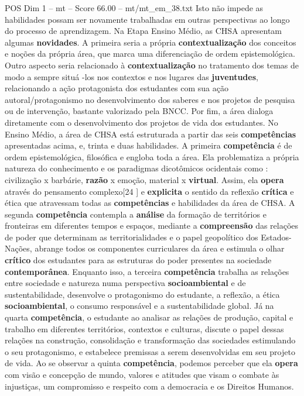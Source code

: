 \begin{textsample}{POS Dim 1 – mt – Score 66.00 – mt/mt\_em\_38.txt}
Isto não impede as habilidades possam ser novamente trabalhadas em outras perspectivas ao longo do processo de aprendizagem.
Na Etapa Ensino Médio, as CHSA apresentam algumas \textbf{novidades}.
A primeira seria a própria \textbf{contextualização} dos conceitos e noções da própria área, que marca uma diferenciação de ordem epistemológica.
Outro aspecto seria relacionado à \textbf{contextualização} no tratamento dos temas de modo a sempre situá -los nos contextos e nos lugares das \textbf{juventudes}, relacionando a ação protagonista dos estudantes com sua ação autoral/protagonismo no desenvolvimento dos saberes e nos projetos de pesquisa ou de intervenção, bastante valorizado pela BNCC.
Por fim, a área dialoga diretamente com o desenvolvimento dos projetos de vida dos estudantes.
No Ensino Médio, a área de CHSA está estruturada a partir das seis \textbf{competências} apresentadas acima, e, trinta e duas habilidades.
A primeira \textbf{competência} é de ordem epistemológica, filosófica e engloba toda a área.
Ela problematiza a própria natureza do conhecimento e os paradigmas dicotômicos ocidentais como : civilização x barbárie, \textbf{razão} x emoção, material x \textbf{virtual}.
Assim, ela \textbf{opera} através do pensamento complexo[24 ] e \textbf{explicita} o sentido da reflexão \textbf{crítica} e ética que atravessam todas as \textbf{competências} e habilidades da área de CHSA.
A segunda \textbf{competência} contempla a \textbf{análise} da formação de territórios e fronteiras em diferentes tempos e espaços, mediante a \textbf{compreensão} das relações de poder que determinam as territorialidades e o papel geopolítico dos Estados-Nações, abrange todos os componentes curriculares da área e estimula o olhar \textbf{crítico} dos estudantes para as estruturas do poder presentes na sociedade \textbf{contemporânea}.
Enquanto isso, a terceira \textbf{competência} trabalha as relações entre sociedade e natureza numa perspectiva \textbf{socioambiental} e de sustentabilidade, desenvolve o protagonismo do estudante, a reflexão, a ética \textbf{socioambiental}, o consumo responsável e a sustentabilidade global.
Já na quarta \textbf{competência}, o estudante ao analisar as relações de produção, capital e trabalho em diferentes territórios, contextos e culturas, discute o papel dessas relações na construção, consolidação e transformação das sociedades estimulando o seu protagonismo, e estabelece premissas a serem desenvolvidas em seu projeto de vida.
Ao se observar a quinta \textbf{competência}, podemos perceber que ela \textbf{opera} com visão e concepção de mundo, valores e atitudes que visam o combate às injustiças, um compromisso e respeito com a democracia e os Direitos Humanos.

\end{textsample}
